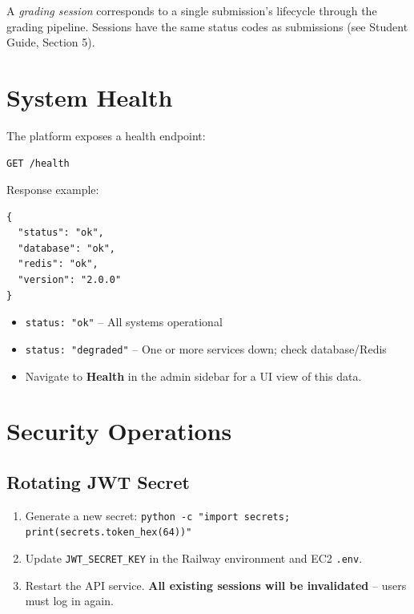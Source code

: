 \documentclass[12pt,a4paper]{article}
\begin{document}
A \emph{grading session} corresponds to a single submission's lifecycle through the grading pipeline. Sessions have the same status codes as submissions (see Student Guide, Section 5).

\section{System Health}

The platform exposes a health endpoint:

\begin{lstlisting}
GET /health
\end{lstlisting}

Response example:
\begin{lstlisting}
{
  "status": "ok",
  "database": "ok",
  "redis": "ok",
  "version": "2.0.0"
}
\end{lstlisting}

\begin{itemize}
  \item \texttt{status: "ok"} -- All systems operational
  \item \texttt{status: "degraded"} -- One or more services down; check database/Redis
  \item Navigate to \textbf{Health} in the admin sidebar for a UI view of this data.
\end{itemize}

\section{Security Operations}

\subsection{Rotating JWT Secret}

\begin{enumerate}
  \item Generate a new secret: \texttt{python -c "import secrets; print(secrets.token\_hex(64))"}
  \item Update \texttt{JWT\_SECRET\_KEY} in the Railway environment and EC2 \texttt{.env}.
  \item Restart the API service. \textbf{All existing sessions will be invalidated} -- users must log in again.
\end{enumerate}
\end{document}
